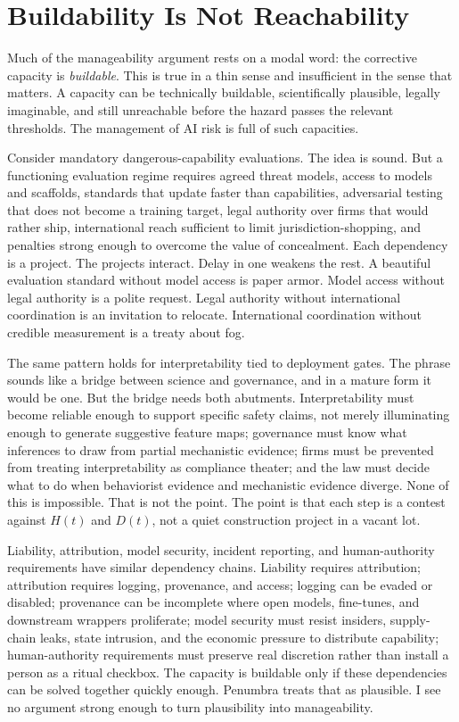 \documentclass[11pt]{article}
\begin{document}
\section{Buildability Is Not Reachability}
\label{sec:buildability}

Much of the manageability argument rests on a modal word: the corrective capacity is \emph{buildable}. This is true in a thin sense and insufficient in the sense that matters. A capacity can be technically buildable, scientifically plausible, legally imaginable, and still unreachable before the hazard passes the relevant thresholds. The management of AI risk is full of such capacities.

Consider mandatory dangerous-capability evaluations. The idea is sound. But a functioning evaluation regime requires agreed threat models, access to models and scaffolds, standards that update faster than capabilities, adversarial testing that does not become a training target, legal authority over firms that would rather ship, international reach sufficient to limit jurisdiction-shopping, and penalties strong enough to overcome the value of concealment. Each dependency is a project. The projects interact. Delay in one weakens the rest. A beautiful evaluation standard without model access is paper armor. Model access without legal authority is a polite request. Legal authority without international coordination is an invitation to relocate. International coordination without credible measurement is a treaty about fog.

The same pattern holds for interpretability tied to deployment gates. The phrase sounds like a bridge between science and governance, and in a mature form it would be one. But the bridge needs both abutments. Interpretability must become reliable enough to support specific safety claims, not merely illuminating enough to generate suggestive feature maps; governance must know what inferences to draw from partial mechanistic evidence; firms must be prevented from treating interpretability as compliance theater; and the law must decide what to do when behaviorist evidence and mechanistic evidence diverge. None of this is impossible. That is not the point. The point is that each step is a contest against $H(t)$ and $D(t)$, not a quiet construction project in a vacant lot.

Liability, attribution, model security, incident reporting, and human-authority requirements have similar dependency chains. Liability requires attribution; attribution requires logging, provenance, and access; logging can be evaded or disabled; provenance can be incomplete where open models, fine-tunes, and downstream wrappers proliferate; model security must resist insiders, supply-chain leaks, state intrusion, and the economic pressure to distribute capability; human-authority requirements must preserve real discretion rather than install a person as a ritual checkbox. The capacity is buildable only if these dependencies can be solved together quickly enough. Penumbra treats that as plausible. I see no argument strong enough to turn plausibility into manageability.
\end{document}
